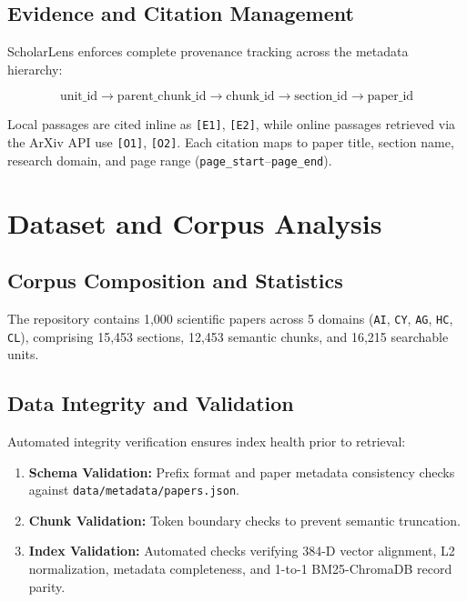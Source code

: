 \documentclass[conference]{IEEEtran}
\begin{document}
\subsection{Evidence and Citation Management}

ScholarLens enforces complete provenance tracking across the metadata hierarchy:

\begin{equation}
\text{unit\_id} \rightarrow \text{parent\_chunk\_id} \rightarrow \text{chunk\_id} \rightarrow \text{section\_id} \rightarrow \text{paper\_id}
\end{equation}

Local passages are cited inline as \texttt{[E1]}, \texttt{[E2]}, while online passages retrieved via the ArXiv API use \texttt{[O1]}, \texttt{[O2]}. Each citation maps to paper title, section name, research domain, and page range (\texttt{page\_start}--\texttt{page\_end}).

\section{Dataset and Corpus Analysis}

\subsection{Corpus Composition and Statistics}

The repository contains 1,000 scientific papers across 5 domains (\texttt{AI}, \texttt{CY}, \texttt{AG}, \texttt{HC}, \texttt{CL}), comprising 15,453 sections, 12,453 semantic chunks, and 16,215 searchable units.

\subsection{Data Integrity and Validation}

Automated integrity verification ensures index health prior to retrieval:
\begin{enumerate}
    \item \textbf{Schema Validation:} Prefix format and paper metadata consistency checks against \texttt{data/metadata/papers.json}.
    \item \textbf{Chunk Validation:} Token boundary checks to prevent semantic truncation.
    \item \textbf{Index Validation:} Automated checks verifying 384-D vector alignment, L2 normalization, metadata completeness, and 1-to-1 BM25-ChromaDB record parity.
\end{enumerate}
\end{document}
